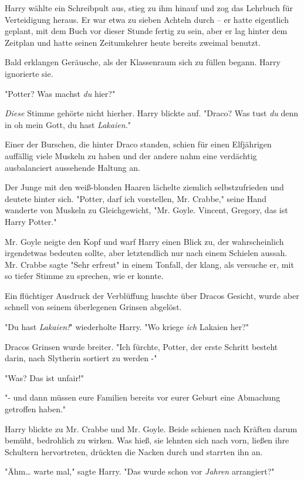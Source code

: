 {Harry wählte ein Schreibpult aus, stieg zu ihm hinauf und zog das Lehrbuch für Verteidigung heraus. Er war etwa zu sieben Achteln durch -- er hatte eigentlich geplant, mit dem Buch vor dieser Stunde fertig zu sein, aber er lag hinter dem Zeitplan und hatte seinen Zeitumkehrer heute bereits zweimal benutzt.

Bald erklangen Geräusche, als der Klassenraum sich zu füllen begann. Harry ignorierte sie.

"Potter? Was machst \emph{du} hier?"

\emph{Diese} Stimme gehörte nicht hierher. Harry blickte auf. "Draco? Was tust \emph{du} denn in oh mein Gott, du hast \emph{Lakaien.}"

Einer der Burschen, die hinter Draco standen, schien für einen Elfjährigen auffällig viele Muskeln zu haben und der andere nahm eine verdächtig ausbalanciert aussehende Haltung an.

Der Junge mit den weiß-blonden Haaren lächelte ziemlich selbstzufrieden und deutete hinter sich. "Potter, darf ich vorstellen, Mr. Crabbe," seine Hand wanderte von Muskeln zu Gleichgewicht, "Mr. Goyle. Vincent, Gregory, das ist Harry Potter."

Mr. Goyle neigte den Kopf und warf Harry einen Blick zu, der wahrscheinlich irgendetwas bedeuten sollte, aber letztendlich nur nach einem Schielen aussah. Mr. Crabbe sagte "Sehr erfreut" in einem Tonfall, der klang, als versuche er, mit so tiefer Stimme zu sprechen, wie er konnte.

Ein flüchtiger Ausdruck der Verblüffung huschte über Dracos Gesicht, wurde aber schnell von seinem überlegenen Grinsen abgelöst.

"Du hast \emph{Lakaien!}" wiederholte Harry. "Wo kriege \emph{ich} Lakaien her?"

Dracos Grinsen wurde breiter. "Ich fürchte, Potter, der erste Schritt besteht darin, nach Slytherin sortiert zu werden -"

"Was? Das ist unfair!"

"- und dann müssen eure Familien bereits vor eurer Geburt eine Abmachung getroffen haben."

Harry blickte zu Mr. Crabbe und Mr. Goyle. Beide schienen nach Kräften darum bemüht, bedrohlich zu wirken. Was hieß, sie lehnten sich nach vorn, ließen ihre Schultern hervortreten, drückten die Nacken durch und starrten ihn an.

"Ähm… warte mal," sagte Harry. "Das wurde schon vor \emph{Jahren} arrangiert?"

}
